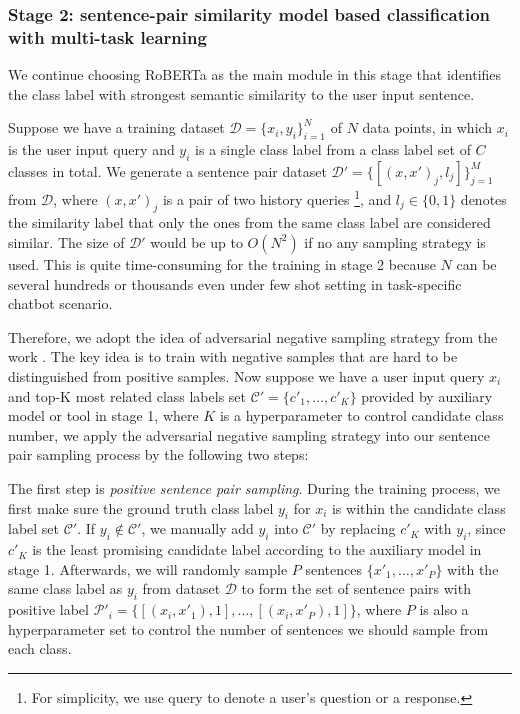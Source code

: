 \subsubsection*{
  Stage 2: sentence-pair similarity model based classification with multi-task
  learning
}
We  continue choosing RoBERTa as the main module in this stage that identifies
the class label with strongest semantic similarity to the user input sentence.

Suppose  we have a training dataset $\mathcal{D}=\{x_{i},y_{i}\}_{i=1}^{N}$ of
$N$  data  points,  in  which $x_{i}$ is the user input query and $y_{i}$ is a
single  class label from a class label set of $C$ classes in total. We 
generate            a sentence            pair            dataset
$\mathcal{D'}=\{[(x,x')_{j},l_{j}]\}_{j=1}^{M}$ from $\mathcal{D}$,   where   $(x,   x')_{j}$  is
a pair of two history queries \footnote{For simplicity, we use query
to denote a user's question or a response.}, and $l_{j}\in\{0, 1\}$ denotes the
similarity label that only the ones from the same class label are considered
similar. The size of $\mathcal{D'}$  would be up to $O(N^2)$ if no any
sampling strategy is used.  This is quite time-consuming  for the  training
in stage 2 because $N$ can be several hundreds or thousands even under 
few shot setting in task-specific chatbot scenario. 

Therefore,  we  adopt  the idea of adversarial negative sampling strategy from
the  work  \cite{bamler2020extreme}.  The  key  idea is to train with negative
samples  that  are hard to be distinguished from positive samples. Now suppose
we  have  a  user  input query $x_{i}$ and top-K most related class labels set
$\mathcal{C'}=\{c'_{1},  \dots,  c'_{K}\}$ provided by auxiliary model or tool
in  stage  1, where $K$ is a hyperparameter to control candidate class number,
we  apply  the  adversarial  negative sampling strategy into our sentence pair
sampling process by the following two steps:

The  first step is \emph{positive sentence pair sampling}. During the training
process,  we  first make sure the ground truth class label $y_{i}$ for $x_{i}$
is  within  the  candidate  class  label  set  $\mathcal{C'}$. If $y_{i}\notin
\mathcal{C'}$,  we  manually  add  $y_{i}$  into  $\mathcal{C'}$  by replacing
$c'_{K}$  with  $y_{i}$, since $c'_{K}$ is the least promising candidate label
according  to  the  auxiliary  model  in stage 1. Afterwards, we will randomly
sample  $P$ sentences $\{x'_{1}, \dots, x'_{P}\}$ with the same class label as
$y_{i}$  from  dataset  $\mathcal{D}$  to  form the set of sentence pairs with
positive  label  $\mathcal{P'}_{i}=\{[(x_{i},  x'_{1}),  1],  \dots,  [(x_{i},
x'_{P}),  1]\}$,  where $P$ is also a hyperparameter set to control the number
of sentences we should sample from each class.

